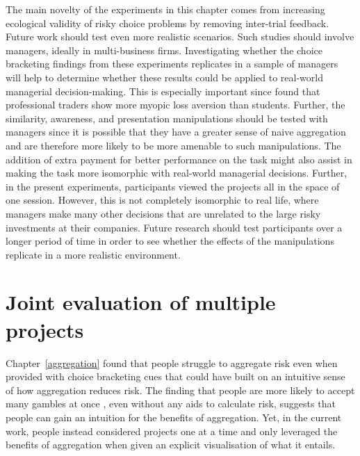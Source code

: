 \documentclass[a4paper, nobind, dvipsnames]{templates/ociamthesis}
\theoremstyle{definition}
\theoremstyle{definition}
\theoremstyle{definition}
\theoremstyle{definition}
\theoremstyle{remark}
\begin{document}
The main novelty of the experiments in this chapter comes from increasing
ecological validity of risky choice problems by removing inter-trial feedback.
Future work should test even more realistic scenarios. Such studies should
involve managers, ideally in multi-business firms. Investigating whether the
choice bracketing findings from these experiments replicates in a sample of
managers will help to determine whether these results could be applied to
real-world managerial decision-making. This is especially important since
\textcite{haigh2005} found that professional traders show more myopic loss aversion than
students. Further, the similarity, awareness, and presentation manipulations
should be tested with managers since it is possible that they have a greater
sense of naive aggregation and are therefore more likely to be more amenable to
such manipulations. The addition of extra payment for better performance on the
task might also assist in making the task more isomorphic with real-world
managerial decisions. Further, in the present experiments, participants viewed
the projects all in the space of one session. However, this is not completely
isomorphic to real life, where managers make many other decisions that are
unrelated to the large risky investments at their companies. Future research
should test participants over a longer period of time \autocite[as in][]{beshears2016} in
order to see whether the effects of the manipulations replicate in a more
realistic environment.

\newpage

\printbibliography[segment=\therefsegment,heading=subbibintoc]

\hypertarget{interstitial-1}{%
\chapter{Joint evaluation of multiple projects}\label{interstitial-1}}

Chapter~\ref{aggregation} found that people struggle to aggregate risk even
when provided with choice bracketing cues that could have built on an intuitive
sense of how aggregation reduces risk. The finding that people are more likely
to accept many gambles at once \autocites[e.g.,][]{samuelson1963,wedell1994}, even without
any aids to calculate risk, suggests that people can gain an intuition for the
benefits of aggregation. Yet, in the current work, people instead considered
projects one at a time and only leveraged the benefits of aggregation when given
an explicit visualisation of what it entails.
\end{document}
